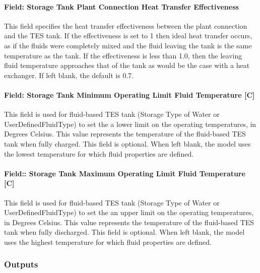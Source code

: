 \paragraph{Field: Storage Tank Plant Connection Heat Transfer Effectiveness}\label{field-storage-tank-plant-connection-heat-transfer-effectiveness}

This field specifies the heat transfer effectiveness between the plant connection and the TES tank. If the effectiveness is set to 1 then ideal heat transfer occurs, as if the fluids were completely mixed and the fluid leaving the tank is the same temperature as the tank. If the effectiveness is less than 1.0, then the leaving fluid temperature approaches that of the tank as would be the case with a heat exchanger. If left blank, the default is 0.7.

\paragraph{Field: Storage Tank Minimum Operating Limit Fluid Temperature {[}C{]}}\label{field-storage-tank-minimum-operating-limit-fluid-temperature-c}

This field is used for fluid-based TES tank (Storage Type of Water or UserDefinedFluidType) to set the a lower limit on the operating temperatures, in Degrees Celsius. This value represents the temperature of the fluid-based TES tank when fully charged. This field is optional. When left blank, the model uses the lowest temperature for which fluid properties are defined.

\paragraph{Field:: Storage Tank Maximum Operating Limit Fluid Temperature {[}C{]}}\label{field-storage-tank-maximum-operating-limit-fluid-temperature-c}

This field is used for fluid-based TES tank (Storage Type of Water or UserDefinedFluidType) to set the an upper limit on the operating temperatures, in Degrees Celsius. This value represents the temperature of the fluid-based TES tank when fully discharged. This field is optional. When left blank, the model uses the highest temperature for which fluid properties are defined.

\subsubsection{Outputs}\label{outputs-29}

